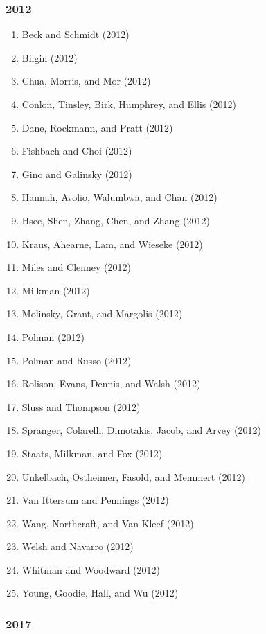 \documentclass[english,man]{apa6}
\providecommand{\tightlist}{%
  \setlength{\itemsep}{0pt}\setlength{\parskip}{0pt}}
\theoremstyle{definition}
\theoremstyle{definition}
\theoremstyle{definition}
\theoremstyle{remark}
\begin{document}
\subsubsection{2012}\label{section-28}

\begin{enumerate}
\def\labelenumi{\arabic{enumi})}
\tightlist
\item
  Beck and Schmidt (2012)
\item
  Bilgin (2012)
\item
  Chua, Morris, and Mor (2012)
\item
  Conlon, Tinsley, Birk, Humphrey, and Ellis (2012)
\item
  Dane, Rockmann, and Pratt (2012)
\item
  Fishbach and Choi (2012)
\item
  Gino and Galinsky (2012)
\item
  Hannah, Avolio, Walumbwa, and Chan (2012)
\item
  Hsee, Shen, Zhang, Chen, and Zhang (2012)
\item
  Kraus, Ahearne, Lam, and Wieseke (2012)
\item
  Miles and Clenney (2012)
\item
  Milkman (2012)
\item
  Molinsky, Grant, and Margolis (2012)
\item
  Polman (2012)
\item
  Polman and Russo (2012)
\item
  Rolison, Evans, Dennis, and Walsh (2012)
\item
  Sluss and Thompson (2012)
\item
  Spranger, Colarelli, Dimotakis, Jacob, and Arvey (2012)
\item
  Staats, Milkman, and Fox (2012)
\item
  Unkelbach, Ostheimer, Fasold, and Memmert (2012)
\item
  Van Ittersum and Pennings (2012)
\item
  Wang, Northcraft, and Van Kleef (2012)
\item
  Welsh and Navarro (2012)
\item
  Whitman and Woodward (2012)
\item
  Young, Goodie, Hall, and Wu (2012)
\end{enumerate}

\subsubsection{2017}\label{section-29}
\end{document}
